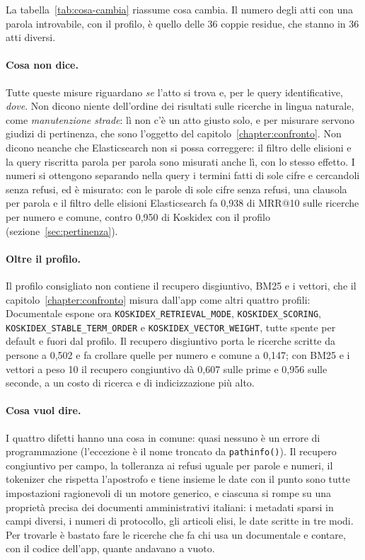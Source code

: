 La tabella~\ref{tab:cosa-cambia} riassume cosa cambia. Il numero degli atti con una
parola introvabile, con il profilo, è quello delle 36 coppie residue, che stanno in
36 atti diversi.

\paragraph{Cosa non dice.} Tutte queste misure riguardano \emph{se} l'atto si
trova e, per le query identificative, \emph{dove}. Non dicono niente dell'ordine
dei risultati sulle ricerche in lingua naturale, come \emph{manutenzione strade}:
lì non c'è un atto giusto solo, e per misurare servono giudizi di pertinenza, che
sono l'oggetto del capitolo~\ref{chapter:confronto}. Non dicono neanche che
Elasticsearch non si possa correggere: il filtro delle elisioni e la query
riscritta parola per parola sono misurati anche lì, con lo stesso effetto. I numeri si
ottengono separando nella query i termini fatti di sole cifre e cercandoli senza
refusi, ed è misurato: con le parole di sole cifre senza refusi, una clausola per parola e il
filtro delle elisioni Elasticsearch fa 0,938 di MRR@10 sulle ricerche per numero e comune, contro 0,950 di Koskidex con
il profilo (sezione~\ref{sec:pertinenza}).

\paragraph{Oltre il profilo.} Il profilo consigliato non contiene il recupero
disgiuntivo, BM25 e i vettori, che il capitolo~\ref{chapter:confronto} misura
dall'app come altri quattro profili: Documentale espone ora
\texttt{KOSKIDEX\_RETRIEVAL\_MODE}, \texttt{KOSKIDEX\_SCORING},
\texttt{KOSKIDEX\_STABLE\_TERM\_ORDER} e \texttt{KOSKIDEX\_VECTOR\_WEIGHT}, tutte
spente per default e fuori dal profilo. Il recupero disgiuntivo porta le
ricerche scritte da persone a 0,502 e fa crollare quelle per numero e comune a
0,147; con BM25 e i vettori a peso 10 il recupero congiuntivo dà 0,607 sulle
prime e 0,956 sulle seconde, a un costo di ricerca e di indicizzazione più
alto.

\paragraph{Cosa vuol dire.} I quattro difetti hanno una cosa in comune: quasi nessuno è
un errore di programmazione (l'eccezione è il nome troncato da \texttt{pathinfo()}). Il recupero congiuntivo per campo, la tolleranza ai
refusi uguale per parole e numeri, il tokenizer che rispetta l'apostrofo e tiene
insieme le date con il punto sono tutte impostazioni ragionevoli di un motore
generico, e ciascuna si rompe su una proprietà precisa dei documenti
amministrativi italiani: i metadati sparsi in campi diversi, i numeri di
protocollo, gli articoli elisi, le date scritte in tre modi. Per trovarle è bastato
fare le ricerche che fa chi usa un documentale e contare, con il codice dell'app,
quante andavano a vuoto.
